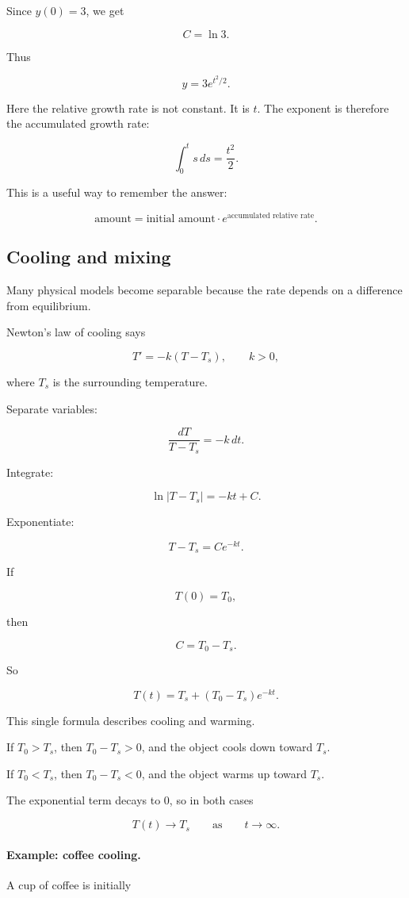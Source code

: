 Since \(y(0)=3\), we get

\[
C=\ln3.
\]

Thus

\[
\boxed{
y=3e^{t^2/2}.
}
\]

Here the relative growth rate is not constant.  It is \(t\).  The exponent is therefore the
accumulated growth rate:

\[
\int_0^t s\,ds=\frac{t^2}{2}.
\]

This is a useful way to remember the answer:

\[
\boxed{
\text{amount}=\text{initial amount}\cdot e^{\text{accumulated relative rate}}.
}
\]

\subsection{Cooling and mixing}
\label{subsec:cooling-and-mixing}

Many physical models become separable because the rate depends on a difference from
equilibrium.

Newton's law of cooling says

\[
T'=-k(T-T_s),
\qquad k>0,
\]

where \(T_s\) is the surrounding temperature.

Separate variables:

\[
\frac{dT}{T-T_s}=-k\,dt.
\]

Integrate:

\[
\ln|T-T_s|=-kt+C.
\]

Exponentiate:

\[
T-T_s=Ce^{-kt}.
\]

If

\[
T(0)=T_0,
\]

then

\[
C=T_0-T_s.
\]

So

\[
\boxed{
T(t)=T_s+(T_0-T_s)e^{-kt}.
}
\]

This single formula describes cooling and warming.

If \(T_0>T_s\), then \(T_0-T_s>0\), and the object cools down toward \(T_s\).

If \(T_0<T_s\), then \(T_0-T_s<0\), and the object warms up toward \(T_s\).

The exponential term decays to \(0\), so in both cases

\[
T(t)\to T_s
\qquad\text{as}\qquad
t\to\infty.
\]

\paragraph{Example: coffee cooling.}
A cup of coffee is initially

